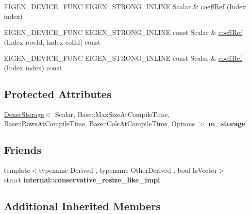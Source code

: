 \begin{DoxyCompactItemize}
\item 
E\+I\+G\+E\+N\+\_\+\+D\+E\+V\+I\+C\+E\+\_\+\+F\+U\+NC E\+I\+G\+E\+N\+\_\+\+S\+T\+R\+O\+N\+G\+\_\+\+I\+N\+L\+I\+NE Scalar \& \mbox{\hyperlink{class_eigen_1_1_matrix_a571632ed666076d7403c8bd3eece44f0}{coeff\+Ref}} (Index index)
\item 
E\+I\+G\+E\+N\+\_\+\+D\+E\+V\+I\+C\+E\+\_\+\+F\+U\+NC E\+I\+G\+E\+N\+\_\+\+S\+T\+R\+O\+N\+G\+\_\+\+I\+N\+L\+I\+NE const Scalar \& \mbox{\hyperlink{class_eigen_1_1_matrix_ab1b33ee10e4c72ec5cf354d511900e62}{coeff\+Ref}} (Index row\+Id, Index col\+Id) const
\item 
E\+I\+G\+E\+N\+\_\+\+D\+E\+V\+I\+C\+E\+\_\+\+F\+U\+NC E\+I\+G\+E\+N\+\_\+\+S\+T\+R\+O\+N\+G\+\_\+\+I\+N\+L\+I\+NE const Scalar \& \mbox{\hyperlink{class_eigen_1_1_matrix_a982b56223d011e2f836a3408983883d4}{coeff\+Ref}} (Index index) const
\end{DoxyCompactItemize}
\subsection*{Protected Attributes}
\begin{DoxyCompactItemize}
\item 
\mbox{\label{class_eigen_1_1_matrix_a1f9b65493a9a3eb3375c3177a080a5e1}} 
\mbox{\hyperlink{class_eigen_1_1_dense_storage}{Dense\+Storage}}$<$ Scalar, Base\+::\+Max\+Size\+At\+Compile\+Time, Base\+::\+Rows\+At\+Compile\+Time, Base\+::\+Cols\+At\+Compile\+Time, Options $>$ {\bfseries m\+\_\+storage}
\end{DoxyCompactItemize}
\subsection*{Friends}
\begin{DoxyCompactItemize}
\item 
\mbox{\label{class_eigen_1_1_matrix_a398280cc73160285ad14db73a8e85c94}} 
{\footnotesize template$<$typename Derived , typename Other\+Derived , bool Is\+Vector$>$ }\\struct {\bfseries internal\+::conservative\+\_\+resize\+\_\+like\+\_\+impl}
\end{DoxyCompactItemize}
\subsection*{Additional Inherited Members}


